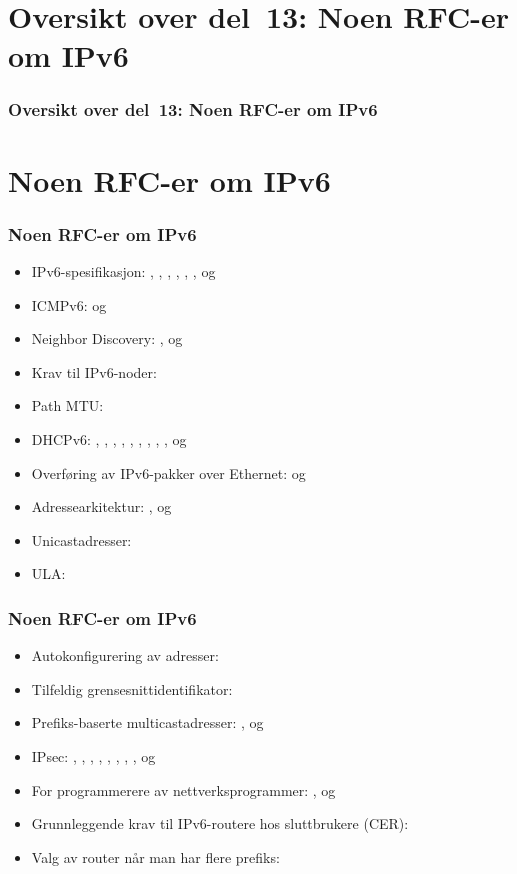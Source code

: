 \begin{frame}
  \partpage
\end{frame}

\section*{Oversikt over del~13: Noen RFC-er om IPv6}
\begin{frame}[allowframebreaks]
  \frametitle{Oversikt over del~13: Noen RFC-er om IPv6}
    \tableofcontents%
\end{frame}

\section{Noen RFC-er om IPv6}
\begin{frame}%
  \frametitle{Noen RFC-er om IPv6}
  \begin{itemize}%
  \item IPv6-spesifikasjon: , , ,
    , , ,  og 
  \item ICMPv6:  og 
  \item Neighbor Discovery: ,  og 
  \item Krav til IPv6-noder: 
  \item Path MTU: 
  \item DHCPv6: , , , ,
    , , , , ,
     og 
  \item Overføring av IPv6-pakker over Ethernet:  og
  \item Adressearkitektur: ,  og 
  \item Unicastadresser: 
  \item ULA: 
  \end{itemize}
\end{frame}

\begin{frame}%
  \frametitle{Noen RFC-er om IPv6}
  \begin{itemize}%
  \item Autokonfigurering av adresser: 
  \item Tilfeldig grensesnittidentifikator: 
  \item Prefiks-baserte multicastadresser: ,  og
  \item IPsec: , , , ,
    , , , ,  og
  \item For programmerere av nettverksprogrammer: ,
     og 
  \item Grunnleggende krav til IPv6-routere hos sluttbrukere (CER):
  \item Valg av router når man har flere prefiks: 
  \end{itemize}
\end{frame}

